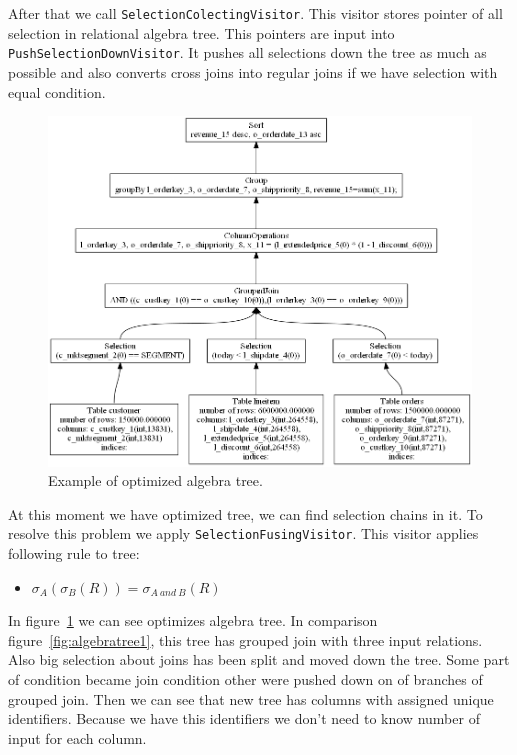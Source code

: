 After that we call \texttt{SelectionColectingVisitor}. This visitor stores pointer of all selection in relational algebra tree. This pointers are input into \texttt{Push\-Selection\-Down\-Visitor}. It pushes all selections down the tree as much as possible and also converts cross joins into regular joins if we have selection with equal condition.
\begin{figure}[h!]
  \centering
    \includegraphics[width=1.0\textwidth]{algebratree2}

      \caption{Example of optimized algebra tree.}
          \label{fig:algebratree2}
\end{figure}
At this moment we have optimized tree, we can find selection chains in it. To resolve this problem we apply \texttt{SelectionFusingVisitor}. This visitor applies following rule to tree:
\begin{itemize}
\item $\sigma_{A}(\sigma_{B}(R))=\sigma_{A~and~B}(R)$
\end{itemize}

In figure~\ref{fig:algebratree2} we can see optimizes algebra tree. In comparison figure~\ref{fig:algebratree1}, this tree has grouped join with three input relations. Also big selection about joins has been split and moved down the tree. Some part of condition became join condition other were pushed down on of branches of grouped join. Then we can see that new tree has columns with assigned unique identifiers. Because we have this identifiers we don't need to know number of input for each column.

